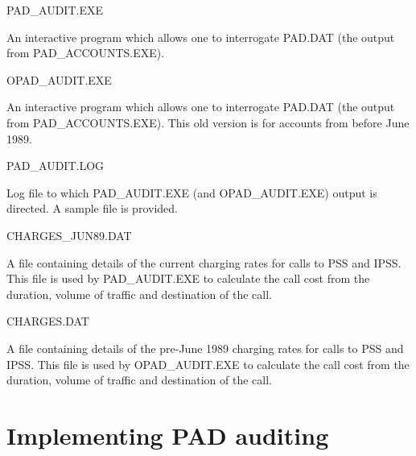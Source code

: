 \begin{list}{}{\setlength{\labelwidth}{\numlen}
\setlength{\leftmargin}{\numlen}
\addtolength{\leftmargin}{\labelsep}}
\item[PAD\_\/AUDIT.EXE]

An interactive program which allows one to
interrogate PAD.DAT (the output from
PAD\_\/ACCOUNTS.EXE).

\item [OPAD\_\/AUDIT.EXE]

An interactive program which allows one to
interrogate PAD.DAT (the output from
PAD\_\/ACCOUNTS.EXE). This old version is
for accounts from before June 1989.

\item [PAD\_\/AUDIT.LOG]

Log file to which PAD\_\/AUDIT.EXE
(and OPAD\_\/AUDIT.EXE) output is
directed. A sample file is provided.

\item [CHARGES\_\/JUN89.DAT]

A file containing details of the current
charging rates for calls to PSS and IPSS.
This file is used by PAD\_\/AUDIT.EXE to calculate
the call cost from the duration, volume of
traffic and destination of the call.

\item [CHARGES.DAT]

A file containing details of the pre-June 1989
charging rates for calls to PSS and IPSS.
This file is used by OPAD\_\/AUDIT.EXE to calculate
the call cost from the duration, volume of
traffic and destination of the call.

\end {list}

\section {Implementing PAD auditing}

